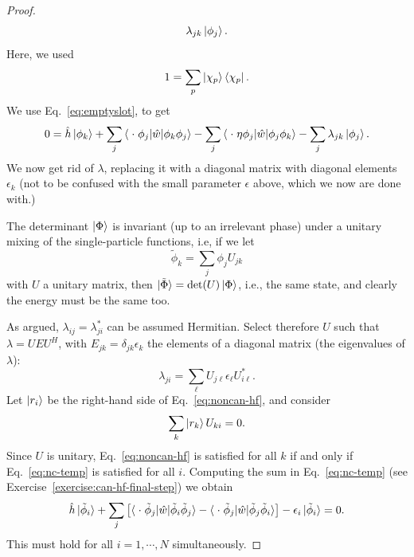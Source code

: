 \documentclass{report}
\theoremstyle{plain}
\theoremstyle{definition}
\begin{document}
\begin{proof}
\begin{equation}
\begin{split}
        \lambda_{jk}\ket{\phi_j} . 
      \end{split}
    \end{equation}
    Here, we used
    \begin{equation}
      1 = \sum_p \ket{\chi_p}\bra{\chi_p}.
    \end{equation}
    We use Eq.~\eqref{eq:emptyslot}, to get
    \begin{equation}
      0 = \hat{h}\ket{\phi_k} 
      + \sum_j
      \braket{\; \cdot\;  \phi_j|\hat{w}|\phi_k\phi_j} - \sum_j
      \braket{\;\cdot \; \eta\phi_j|\hat{w}|\phi_j\phi_k} - \sum_j
      \lambda_{jk} \ket{\phi_j} .\label{eq:noncan-hf}
    \end{equation}
    We now get rid of $\lambda$, replacing it with a diagonal matrix
    with diagonal elements $\epsilon_k$ (not to be confused with the
    small parameter $\epsilon$ above, which we now are done with.) 

    The determinant
    $\ket{\Phi}$ is invariant (up to an irrelevant phase) under a
    unitary mixing of the single-particle functions, i.e, if we let
  \begin{equation}
    \tilde{\phi}_k = \sum_j \phi_j U_{jk}
  \end{equation}
  with $U$ a unitary matrix, then
  $\ket{\tilde{\Phi}}=\det(U)\ket{\Phi}$, i.e., the same state, and
  clearly the energy must be the same too.
  
  As argued, $\lambda_{ij}=\lambda_{ji}^*$ can be assumed Hermitian.
  Select therefore $U$ such that $\lambda
  = U E U^H$, with $E_{jk} = \delta_{jk}\epsilon_k$ the elements of a
  diagonal matrix (the eigenvalues of $\lambda$):
  \begin{equation}
    \lambda_{ji} = \sum_\ell U_{j\ell} \epsilon_\ell U^*_{i\ell}.
  \end{equation}
  Let $\ket{r_i}$ be the right-hand side of Eq.~\eqref{eq:noncan-hf},
  and consider
  \begin{equation}
    \sum_k  \ket{r_k} U_{ki} = 0. \label{eq:nc-temp}
  \end{equation}
  Since $U$ is unitary, Eq.~\eqref{eq:noncan-hf} is satisfied 
  for all $k$ if and only if Eq.~\eqref{eq:nc-temp} is satisfied for all
  $i$. Computing the sum in Eq.~\eqref{eq:nc-temp} (see
  Exercise~\ref{exercise:can-hf-final-step}) we obtain
  \begin{equation}
    \hat{h}\ket{\tilde{\phi}_i} + \sum_{j}\left[
    \braket{\;\cdot\; \tilde{\phi}_j|\hat{w}|\tilde{\phi}_i\tilde{\phi}_j} - \braket{\;\cdot\;\tilde{\phi}_j|\hat{w}|\tilde{\phi}_j \tilde{\phi}_i}\right] -
    \epsilon_i \ket{\tilde{\phi}_i} = 0. \label{eq:can-hf}
  \end{equation}
  This must hold for all $i=1,\cdots,N$ simultaneously.
  

\end{proof}
\end{document}
